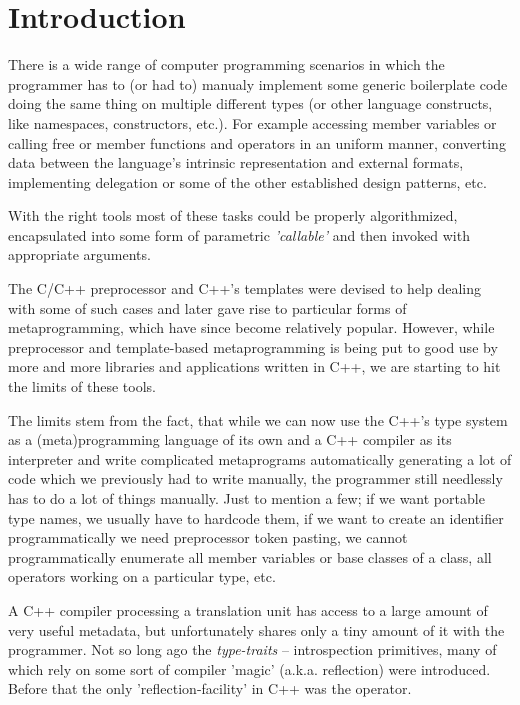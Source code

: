 \section{Introduction}

There is a wide range of computer programming scenarios in which
the programmer has to (or had to) manualy implement some generic boilerplate
code doing the same thing on multiple different types (or other language constructs,
like namespaces, constructors, etc.). For example accessing member variables or
calling free or member functions and operators in an uniform
manner, converting data between the language's intrinsic representation and
external formats, implementing delegation or some of the other
established design patterns, etc.

With the right tools most of these tasks could be properly algorithmized,
encapsulated into some form of parametric {\em 'callable'} and then invoked
with appropriate arguments.

The C/C++ preprocessor and C++'s templates were devised to help dealing
with some of such cases and later gave rise to particular forms of metaprogramming,
which have since become relatively popular. However, while preprocessor and template-based
metaprogramming is being put to good use by more and more libraries and applications written
in C++, we are starting to hit the limits of these tools.

The limits stem from the fact, that while we can now use the C++'s type system
as a (meta)programming language of its own and a C++ compiler as its interpreter
and write complicated metaprograms automatically generating a lot of code
which we previously had to write manually, the programmer still needlessly has to do
a lot of things manually. Just to mention a few; if we want portable type names,
we usually have to hardcode them, if we want to create an identifier programmatically
we need preprocessor token pasting, we cannot programmatically enumerate all member
variables or base classes of a class, all operators working on a particular type, etc.

A C++ compiler processing a translation unit has access to a large amount
of very useful metadata, but unfortunately shares only a tiny amount of it
with the programmer. Not so long ago the {\em type-traits} -- introspection primitives,
many of which rely on some sort of compiler 'magic' (a.k.a. reflection) were introduced.
Before that the only 'reflection-facility' in C++ was the \verb@typeid@ operator.

